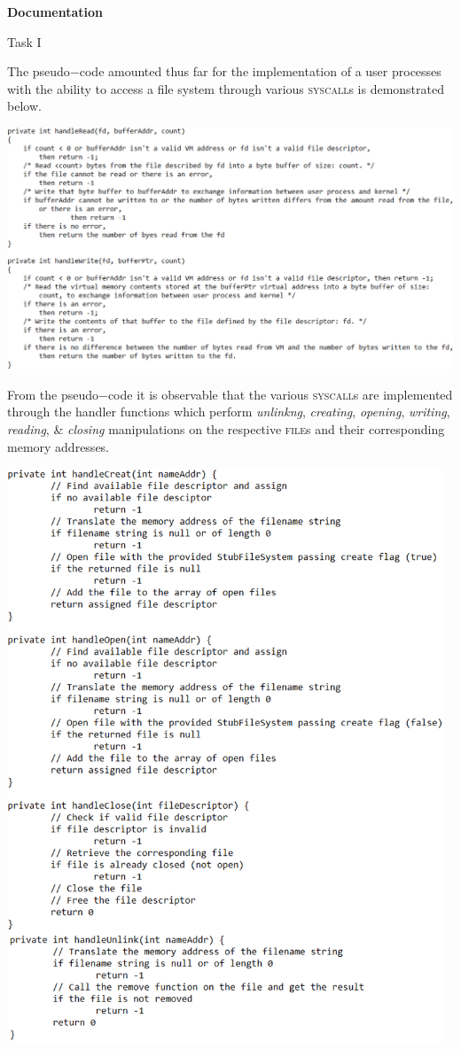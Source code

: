 \documentclass[12pt]{article}
\begin{document}
{\setlength{\parindent}{0cm}
\textbf{Documentation}\\
\begin{center}Task I\end{center}
The pseudo$-$code amounted thus far for the implementation of a user processes with the ability to access a file system through various 
\textsc{syscall}s is demonstrated below.
\begin{center}\includegraphics[width=150mm]{pic1_1.png}\end{center}
From the pseudo$-$code it is observable that the various \textsc{syscall}s are implemented through the handler functions which perform
 \textit{unlinkng}, \textit{creating}, \textit{opening}, \textit{writing}, \textit{reading}, \& \textit{closing} manipulations on the 
 respective \textsc{file}s and their corresponding memory addresses.
\begin{center}\includegraphics[width=130mm]{pic5.png}\end{center}
}
\end{document}
